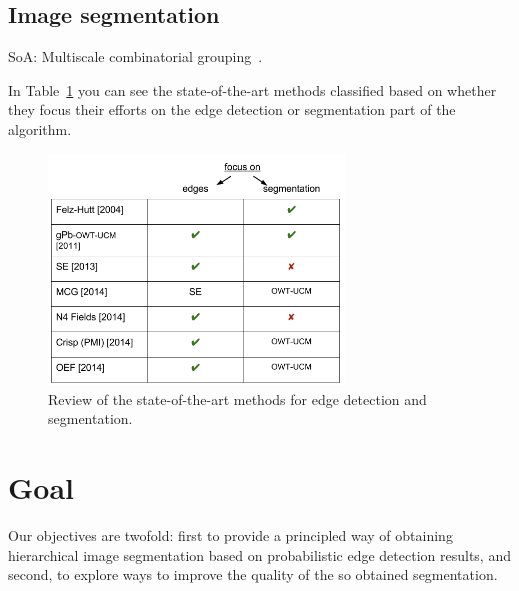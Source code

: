 \subsection{Image segmentation}

SoA: Multiscale combinatorial grouping~\cite{Arbelaez2014multiscale}.

In Table~\ref{fig:related_work_table} you can see the state-of-the-art methods classified based on whether they focus their efforts on the edge detection or segmentation part of the algorithm.

\begin{figure}[ht!]
\centering
  \includegraphics[width=0.7\textwidth]{images/related_work_table.png}
\caption[Related work: state of the art]{Review of the state-of-the-art methods for edge detection and segmentation.}
\label{fig:related_work_table}
\end{figure}

\section{Goal}
Our objectives are  twofold:  first to provide a principled way of obtaining hierarchical image segmentation based on probabilistic edge detection results, and second, to explore ways to improve the quality of the so %
obtained segmentation.




